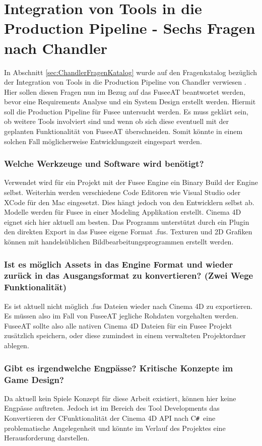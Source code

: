 \documentclass[pagesize, paper=a4, fontsize=12pt, titlepage=true, headings=small, headnosepline, abstractoff, liststotoc, nochapterprefix, plainheadsepline, twoside]{scrreprt}
\newcommand{\CSS}{C\texttt{\# }}
\newcommand{\CPP}{C\nolinebreak\hspace{-.05em}\raisebox{.4ex}{\tiny\bf +}\nolinebreak\hspace{-.10em}\raisebox{.4ex}{\tiny\bf +}}
\begin{document}
\section{Integration von Tools in die Production Pipeline - Sechs Fragen nach Chandler }\label{sec:ChandlerFragenAntwort}
In Abschnitt \ref{sec:ChandlerFragenKatalog} wurde auf den Fragenkatalog bezüglich der Integration von Tools in die Production Pipeline von Chandler verwiesen \parencite[S. 223-224]{Chandler2006}. Hier sollen diesen Fragen nun im Bezug auf das FuseeAT beantwortet werden, bevor eine Requirements Analyse und ein System Design erstellt werden. Hiermit soll die Production Pipeline für Fusee untersucht werden. Es muss geklärt sein, ob weitere Tools involviert sind und wenn ob sich diese eventuell mit der geplanten Funktionalität von FuseeAT überschneiden. Somit könnte in einem solchen Fall möglicherweise Entwicklungszeit eingespart werden.

\subsubsection{Welche Werkzeuge und Software wird benötigt?}
Verwendet wird für ein Projekt mit der Fusee Engine ein Binary Build der Engine selbst. Weiterhin werden verschiedene Code Editoren wie Visual Studio oder XCode für den Mac eingesetzt. Dies hängt jedoch von den Entwicklern selbst ab. Modelle werden für Fusee in einer Modeling Applikation erstellt. Cinema 4D eignet sich hier aktuell am besten. Das Programm unterstützt durch ein Plugin den direkten Export in das Fusee eigene Format .fus. Texturen und 2D Grafiken können mit handelsüblichen Bildbearbeitungsprogrammen erstellt werden.

\subsubsection{Ist es möglich Assets in das Engine Format und wieder zurück in das Ausgangsformat zu konvertieren? (Zwei Wege Funktionalität)}
Es ist aktuell nicht möglich .fus Dateien wieder nach Cinema 4D zu exportieren. Es müssen also im Fall von FuseeAT jegliche Rohdaten vorgehalten werden. FuseeAT sollte also alle nativen Cinema 4D Dateien für ein Fusee Projekt zusätzlich speichern, oder diese zumindest in einem verwalteten Projektordner ablegen.

\subsubsection{Gibt es irgendwelche Engpässe? Kritische Konzepte im Game Design?}
Da aktuell kein Spiele Konzept für diese Arbeit existiert, können hier keine Engpässe auftreten. Jedoch ist im Bereich des Tool Developments das Konvertieren der \CPP Funktionalität der Cinema 4D API nach \CSS eine problematische Angelegenheit und könnte im Verlauf des Projektes eine Herausforderung darstellen.
\end{document}
